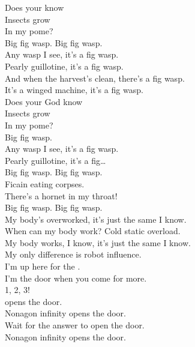 Does your  know \\
Insects grow \\
In my pome? \\

Big fig wasp. Big fig wasp. \\

Any wasp I see, it's a fig wasp. \\
Pearly guillotine, it's a fig wasp. \\
And when the harvest's clean, there's a fig wasp. \\
It's a winged machine, it's a fig wasp. \\

Does your God know \\
Insects grow \\
In my pome? \\

Big fig wasp. \\

Any wasp I see, it's a fig wasp. \\
Pearly guillotine, it's a fig… \\

Big fig wasp. Big fig wasp. \\

Ficain eating corpses. \\
There's a hornet in my throat! \\

Big fig wasp. Big fig wasp. \\

My body's overworked, it's just the same I know. \\
When can my body work? Cold static overload. \\
My body works, I know, it's just the same I know. \\
My only difference is robot influence. \\

I'm up here for the . \\
I'm the door when you come for more. \\

1, 2, 3! \\

 opens the door. \\
Nonagon infinity opens the door. \\
Wait for the answer to open the door. \\
Nonagon infinity opens the door. \\

